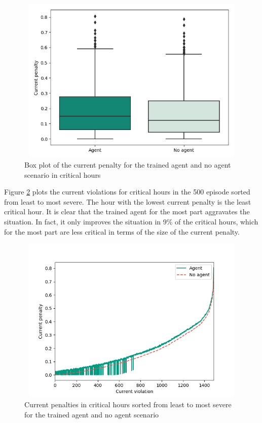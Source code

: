 \documentclass[class=book, crop=false, 11pt]{standalone}
\begin{document}
\begin{figure}[h]
    \center
\includegraphics[height=8cm, width=12cm]{figures/config1_current_boxplot.png}
    \caption[size = 9]{Box plot of the current penalty for the trained agent and no agent scenario in critical hours}
    \label{fig:results:config1_current_boxplot}
\end{figure}
Figure \ref{fig:results:config1_sorted_current} plots the current violations for critical hours in the 500 episode sorted from least to most severe. The hour with the lowest current penalty is the least critical hour. It is clear that the trained agent for the most part aggravates the situation. In fact, it only improves the situation in 9\% of the critical hours, which for the most part are less critical in terms of the size of the current penalty. 

\begin{figure}[h]
    \center
\includegraphics[height=8cm, width=12cm]{figures/config1_sorted_current.png}
    \caption[size = 9]{Current penalties in critical hours sorted from least to most severe for the trained agent and no agent scenario}
    \label{fig:results:config1_sorted_current}
\end{figure}
\end{document}
